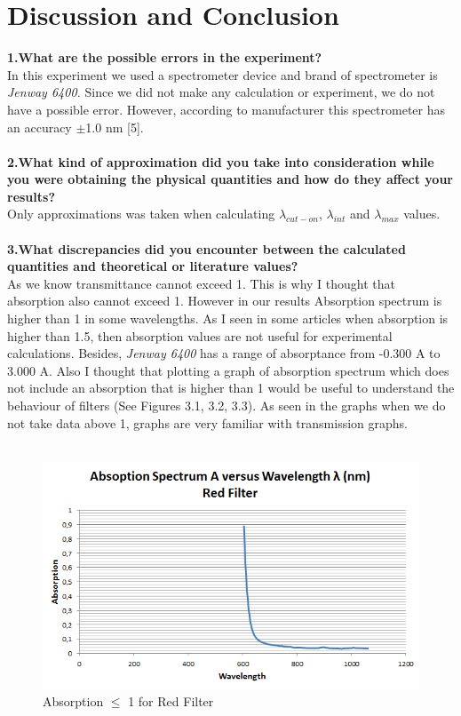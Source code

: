 \documentclass[a4paper,12pt]{report}
\begin{document}
\chapter{Discussion and Conclusion}
\textbf{1.What are the possible errors in the experiment?}\\
In this experiment we used a spectrometer device and brand of spectrometer is \textit{Jenway 6400.} Since we did not make any calculation or experiment, we do not have a possible error. However, according to manufacturer this spectrometer has an accuracy $\pm$1.0 nm [5].\\\\
\textbf{2.What kind of approximation did you take into consideration while you were obtaining the physical quantities and how do they affect your results?}\\
Only approximations was taken when calculating $\lambda_{cut-on}$, $\lambda_{int}$ and $\lambda_{max}$ values.\\\\
\textbf{3.What discrepancies did you encounter between the calculated quantities and theoretical or literature values?}\\
As we know transmittance cannot exceed 1. This is why I thought that absorption also cannot exceed 1. However in our results Absorption spectrum is higher than 1 in some wavelengths. As I seen in some articles when absorption is higher than 1.5, then absorption values are not useful for experimental calculations. Besides, \textit{Jenway 6400} has a range of absorptance from -0.300 A to 3.000 A. Also I thought that plotting a graph of absorption spectrum which does not include an absorption that is higher than 1 would be useful to understand the behaviour of filters (See Figures 3.1, 3.2, 3.3). As seen in the graphs when we do not take data above 1, graphs are very familiar with transmission graphs.\\\\
\begin{figure}[h!]
\centering
\includegraphics[width=1.0\linewidth, height=0.4\textheight]{A-Red}
\caption{Absorption $\leq$ 1 for Red Filter}
\label{fig:A-Red}
\end{figure}
\end{document}
